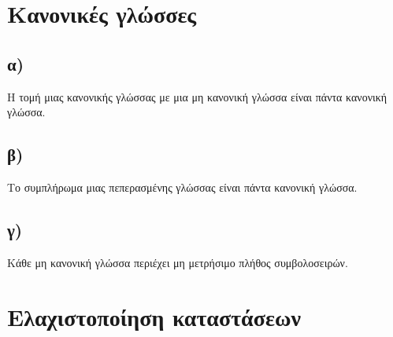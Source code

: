 \section{Κανονικές γλώσσες}
\subsection[Ερώτημα α]{\textbf{α) }} Η τομή μιας κανονικής γλώσσας με μια μη κανονική γλώσσα είναι πάντα κανονική γλώσσα.

\subsection[Ερώτημα β]{\textbf{β) }} Το συμπλήρωμα μιας πεπερασμένης γλώσσας είναι πάντα κανονική γλώσσα.

\subsection[Ερώτημα γ]{\textbf{γ) }} Κάθε μη κανονική γλώσσα περιέχει μη μετρήσιμο πλήθος συμβολοσειρών.

\section{Ελαχιστοποίηση καταστάσεων}

